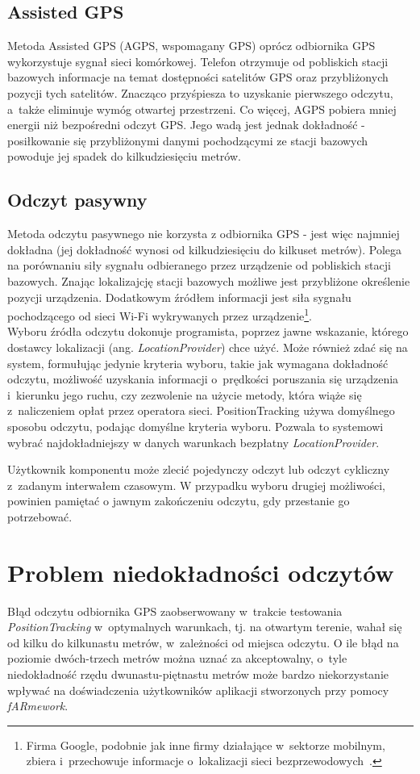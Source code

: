 \documentclass[a4paper,twocolumn,11pt]{article}
\begin{document}
\subsection{Assisted GPS}
 Metoda Assisted GPS (AGPS, wspomagany GPS) oprócz odbiornika GPS wykorzystuje sygnał sieci komórkowej.
 Telefon otrzymuje od pobliskich stacji bazowych informacje na temat dostępności satelitów GPS oraz przybliżonych pozycji tych satelitów.
 Znacząco przyśpiesza to uzyskanie pierwszego odczytu, a~także eliminuje wymóg otwartej przestrzeni.
 Co więcej, AGPS pobiera mniej energii niż bezpośredni odczyt GPS.
 Jego wadą jest jednak dokładność - posiłkowanie się przybliżonymi danymi pochodzącymi ze stacji bazowych powoduje jej spadek do kilkudziesięciu metrów.

\subsection{Odczyt pasywny}
 Metoda odczytu pasywnego nie korzysta z odbiornika GPS - jest więc najmniej dokładna (jej dokładność wynosi od kilkudziesięciu do kilkuset metrów).
 Polega na porównaniu siły sygnału odbieranego przez urządzenie od pobliskich stacji bazowych.
 Znając lokalizajcję stacji bazowych możliwe jest przybliżone określenie pozycji urządzenia.
 Dodatkowym źródłem informacji jest siła sygnału pochodzącego od sieci Wi-Fi wykrywanych przez urządzenie\footnote{Firma Google, podobnie jak inne firmy działające w~sektorze mobilnym, zbiera i~przechowuje informacje o~lokalizacji sieci bezprzewodowych~\cite{wifi:loc}.}.\\

Wyboru źródła odczytu dokonuje programista, poprzez jawne wskazanie, którego dostawcy lokalizacji (ang. \emph{LocationProvider}) chce użyć.
Może również zdać się na system, formułując jedynie kryteria wyboru, takie jak wymagana dokładność odczytu, możliwość uzyskania informacji o~prędkości poruszania się urządzenia i~kierunku jego ruchu, czy zezwolenie na użycie metody, która wiąże się z~naliczeniem opłat przez operatora sieci.
PositionTracking używa domyślnego sposobu odczytu, podając domyślne kryteria wyboru.
Pozwala to systemowi wybrać najdokładniejszy w danych warunkach bezpłatny \emph{LocationProvider}.

Użytkownik komponentu może zlecić pojedynczy odczyt lub odczyt cykliczny z~zadanym interwałem czasowym.
W przypadku wyboru drugiej możliwości, powinien pamiętać o jawnym zakończeniu odczytu, gdy przestanie go potrzebować.

\section{Problem niedokładności odczytów}
 Błąd odczytu odbiornika GPS zaobserwowany w~trakcie testowania \emph{PositionTracking} w~optymalnych warunkach, tj. na otwartym terenie, wahał się od kilku do kilkunastu metrów, w~zależności od miejsca odczytu.
 O ile błąd na poziomie dwóch-trzech metrów można uznać za akceptowalny, o~tyle niedokładność rzędu dwunastu-piętnastu metrów może bardzo niekorzystanie wpływać na doświadczenia użytkowników aplikacji stworzonych przy pomocy \emph{fARmework}.
 
\end{document}
